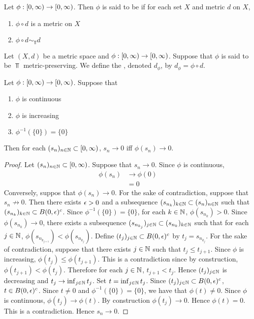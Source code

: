 \documentclass{book}
\begin{document}
\begin{defn}
	Let $\phi: [0,\infty) \rightarrow [0,\infty)$. Then $\phi$ is said to be  if for each set $X$ and metric $d$ on $X$, 
	\begin{enumerate}
		\item $\phi \circ d$ is a metric on $X$
		\item $\phi \circ d \sim_{\Top} d$
	\end{enumerate} 
\end{defn}

\begin{defn}
	Let $(X, d)$ be a metric space and $\phi: [0,\infty) \rightarrow [0,\infty)$. Suppose that $\phi$ is said to be $\Top$ metric-preserving. We define the , denoted $d_{\phi}$, by $d_{\phi} = \phi \circ d$.  
\end{defn}

\begin{ex}
	Let $\phi: [0,\infty) \rightarrow [0,\infty)$. Suppose that  
	\begin{enumerate}
		\item $\phi$ is continuous
		\item $\phi$ is increasing
		\item $\phi^{-1}(\{0\}) = \{0\}$ 
	\end{enumerate}
	Then for each $(s_n)_{n \in \mathbb{N}} \subset [0,\infty)$, $s_n \rightarrow 0$ iff $\phi(s_n) \rightarrow 0$. 
\end{ex}

\begin{proof}
	Let $(s_n)_{n \in \mathbb{N}} \subset [0,\infty)$. Suppose that $s_n \rightarrow 0$. Since $\phi$ is continuous, 
	\begin{align*}
		\phi(s_n) 
		& \rightarrow \phi(0) \\
		& = 0
	\end{align*}
	Conversely, suppos that $\phi(s_n) \rightarrow 0$. For the sake of contradiction, suppose that $s_n \not \rightarrow 0$. Then there exists $\epsilon >0$ and a subsequence $(s_{n_k})_{k \in \mathbb{N}} \subset (s_n)_{n \in \mathbb{N}}$ such that $(s_{n_k})_{k \in \mathbb{N}} \subset B(0, \epsilon)^c$. Since $\phi^{-1}(\{0\}) = \{0\}$, for each $k \in \mathbb{N}$, $\phi(s_{n_k}) >0$. Since $\phi(s_{n_k}) \rightarrow 0$, there exists a subsequence $(s_{n_{k_j}})_{j \in \mathbb{N}} \subset (s_{n_k})_{k \in \mathbb{N}}$ such that for each $j \in \mathbb{N}$, $\phi(s_{n_{k_{j+1}}}) < \phi(s_{n_{k_j}})$. Define $(t_j)_{j \in \mathbb{N}} \subset B(0,\epsilon)^c$ by $t_j = s_{n_{k_j}}$. For the sake of contradiction, suppose that there exists $j \in \mathbb{N}$ such that $t_j \leq t_{j+1}$. Since $\phi$ is increasing, $\phi(t_j) \leq \phi(t_{j+1})$. This is a contradiction since by construction, $\phi(t_{j+1}) < \phi(t_j)$. Therefore for each $j \in \mathbb{N}$, $t_{j+1} < t_j$. Hence $(t_j)_{j \in \mathbb{N}}$ is decreasing and $t_j \rightarrow \inf_{j \in \mathbb{N}} t_j$. Set $t = \inf_{j \in \mathbb{N}} t_j$. Since $(t_j)_{j \in \mathbb{N}} \subset B(0, \epsilon)^c$, $t \in B(0, \epsilon)^c$. Since $t \neq 0$ and $\phi^{-1}(\{0\}) = \{0\}$, we have that $\phi(t) \neq 0$. Since $\phi$ is continuous, $\phi(t_j) \rightarrow \phi(t)$. By construction $\phi(t_j) \rightarrow 0$. Hence $\phi(t) = 0$. This is a contradiction. Hence $s_n \rightarrow 0$.
\end{proof}
\end{document}
